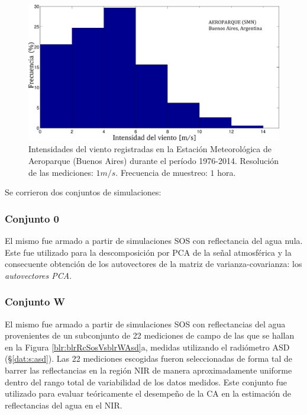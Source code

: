         \begin{figure}
        \centering
        \includegraphics[width=\textwidth]{pca/figures/VIENTO_AEROPARQUE.png}
        \caption[Intensidades del viento registradas en la Estación Meteorológica de Aeroparque (Buenos Aires) durante el período 1976-2014.]{Intensidades del viento registradas en la Estación Meteorológica de Aeroparque (Buenos Aires) durante el período 1976-2014. Resolución de las mediciones: $1 m/s$. Frecuencia de muestreo: $1$ hora.}
        \label{pca:VIENTO_AEROPARQUE}
        \end{figure}

        Se corrieron dos conjuntos de simulaciones:
        
        \subsubsection{Conjunto 0}
        \label{pca:s:conjunto0}
        
            El mismo fue armado a partir de simulaciones SOS con reflectancia del agua nula. Este fue utilizado para la descomposición por PCA de la señal atmosférica y la consecuente obtención de los autovectores de la matriz de varianza-covarianza: los \textit{autovectores PCA}.
        
        \subsubsection{Conjunto W}
        \label{pca:s:conjuntoW}
        
            El mismo fue armado a partir de simulaciones SOS con reflectancias del agua provenientes de un subconjunto de 22 mediciones de campo de las que se hallan en la Figura \ref{blr:blrRcSosVsblrWAsd}a, medidas utilizando el radiómetro ASD (\S \ref{dat:s:asd}). Las 22 mediciones escogidas fueron seleccionadas de forma tal de barrer las reflectancias en la región NIR de manera aproximadamente uniforme dentro del rango total de variabilidad de los datos medidos. Este conjunto fue utilizado para evaluar teóricamente el desempeño de la CA en la estimación de reflectancias del agua en el NIR.
    
